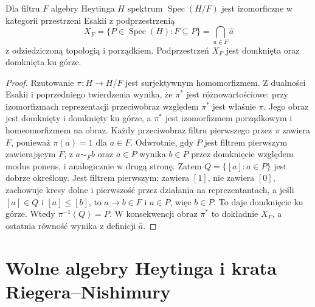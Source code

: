 \begin{wniosek}
\label{cor:ncl-heyting-quotient-spectrum}
Dla filtru $F$ algebry Heytinga $H$ spektrum
$\operatorname{Spec}(H/F)$ jest izomorficzne
w kategorii przestrzeni Esakii z podprzestrzenią
\[
 X_F=\{P\in\operatorname{Spec}(H):F\subseteq P\}
     =\bigcap_{a\in F}\widehat a
\]
z odziedziczoną topologią i porządkiem.
Podprzestrzeń $X_F$ jest domknięta oraz
domknięta ku górze.
\end{wniosek}
\begin{proof}
Rzutowanie $\pi:H\to H/F$ jest surjektywnym
homomorfizmem. Z dualności Esakii i poprzedniego
twierdzenia wynika, że $\pi^*$ jest różnowartościowe:
przy izomorfizmach reprezentacji przeciwobraz
względem $\pi^*$ jest właśnie $\pi$.
Jego obraz jest domknięty i domknięty ku górze,
a $\pi^*$ jest izomorfizmem porządkowym
i homeomorfizmem na obraz.
Każdy przeciwobraz filtru pierwszego przez $\pi$
zawiera $F$, ponieważ $\pi(a)=1$ dla $a\in F$.
Odwrotnie, gdy $P$ jest filtrem pierwszym
zawierającym $F$, z $a\sim_F b$ oraz $a\in P$
wynika $b\in P$ przez domknięcie względem
modus ponens, i analogicznie w drugą stronę.
Zatem $Q=\{[a]:a\in P\}$ jest dobrze określony.
Jest filtrem pierwszym: zawiera $[1]$, nie
zawiera $[0]$, zachowuje kresy dolne i pierwszość
przez działania na reprezentantach, a jeśli
$[a]\in Q$ i $[a]\leq[b]$, to $a\to b\in F$
i $a\in P$, więc $b\in P$. To daje domknięcie
ku górze. Wtedy $\pi^{-1}(Q)=P$.
W konsekwencji obraz $\pi^*$ to dokładnie $X_F$,
a ostatnia równość wynika z definicji $\widehat a$.
\end{proof}

\section{Wolne algebry Heytinga i krata Riegera--Nishimury}

